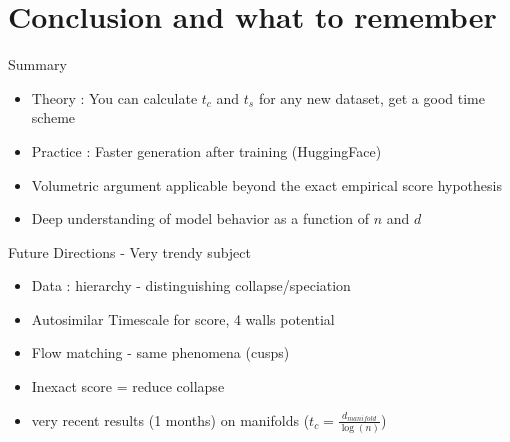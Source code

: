 \documentclass[aspectratio=169]{beamer}
\begin{document}
\section{Conclusion and what to remember}

\begin{frame}{Summary}
    \begin{itemize}
        \item Theory : You can calculate $t_c$ and $t_s$ for any new dataset, get a good time scheme
        \item Practice : Faster generation after training (HuggingFace)
    \end{itemize}

    \begin{itemize}
        \item Volumetric argument applicable beyond the exact empirical score hypothesis
        \item Deep understanding of model behavior as a function of $n$ and $d$
    \end{itemize}
\end{frame}


\begin{frame}{Future Directions - Very trendy subject}
    \begin{itemize}
        \item Data : hierarchy - distinguishing collapse/speciation
        \item Autosimilar Timescale for score, 4 walls potential
        \item Flow matching - same phenomena (cusps)
        \item Inexact score  = reduce collapse
        \item very recent results (1 months) on manifolds ($t_c = \frac{d_{manifold}}{\log(n)}$)
    \end{itemize}
    
    \begin{center}
    \end{center}
\end{frame}
\end{document}
